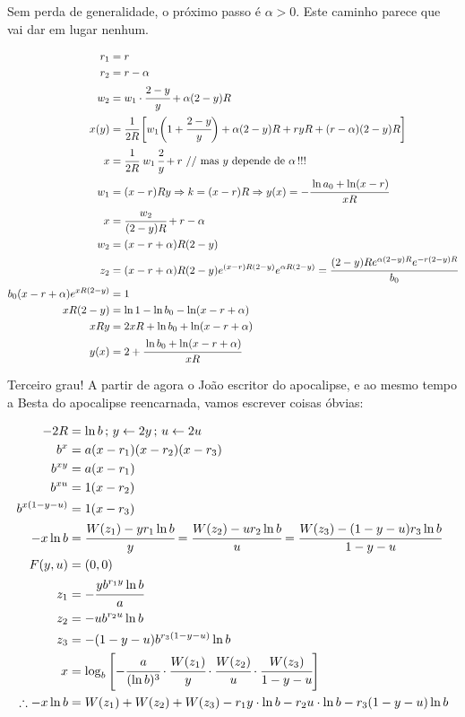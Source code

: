 \documentclass[11pt,a4paper]{article}
\begin{document}
Sem perda de generalidade, o pr\'oximo passo \'e $\alpha > 0$. Este caminho parece que vai dar em lugar nenhum.

\begin{align}
r_1 &= r \\
r_2 &= r - \alpha \\
w_2 &= w_1\cdot \cfrac{2 - y}{y} + \alpha (2 - y) R \\
x(y) &= \cfrac{1}{2R}\, \bigg[w_1\bigg(1 + \cfrac{2 - y}{y}\bigg) + \alpha (2 - y) R + ryR + (r - \alpha)(2 - y)R\bigg] \\
x &=  \cfrac{1}{2R}\,\,w_1\,\cfrac{2}{y} + r \text{ // mas } y \text{ depende de }\alpha\,!!! \\
w_1 &= (x - r)Ry \Rightarrow k = (x - r)R \Rightarrow y(x) = - \cfrac{\ln a_0 + \ln (x - r)}{xR} \\
x &=  \cfrac{w_2}{(2-y)R} + r - \alpha \\
w_2 &= (x - r + \alpha)R(2-y) \\
z_2 &= (x - r + \alpha)R(2-y)e^{(x - r)R(2-y)}e^{\alpha R(2-y)} = \cfrac{(2 - y)Re^{\alpha(2 - y)R}e^{-r(2 - y)R}}{b_0} \\
b_0 (x - r + \alpha)e^{xR(2-y)} &= 1 \\
xR(2-y) &= \ln 1 - \ln b_0 - \ln (x - r + \alpha) \\
xRy &= 2xR + \ln b_0 + \ln (x - r + \alpha) \\
y(x) &= 2 + \cfrac{\ln b_0 + \ln (x - r + \alpha)}{xR}
\end{align}

Terceiro grau! A partir de agora o Jo\~ao escritor do apocalipse, e ao mesmo tempo a Besta do apocalipse reencarnada, vamos escrever coisas \'obvias:

\begin{align}
  -2R &= \ln b\,;\,y \leftarrow 2y\,;\,u \leftarrow 2u \\
  b^x &= a (x - r_1) (x - r_2) (x - r_3) \\
  b^{xy} &= a (x - r_1) \\
  b^{xu} &= 1 (x - r_2) \\
  b^{x(1 - y - u)} &= 1 (x - r_3) \\
  -x \ln b &= \cfrac{W(z_1) - y r_1 \ln b}{y} = \cfrac{W(z_2) - u r_2 \ln b}{u} = \cfrac{W(z_3) - (1 - y - u) r_3 \ln b}{1 - y - u} \\
  F(y,u) &= (0,0) \\
  z_1 &= - \cfrac{yb^{r_1y} \ln b}{a} \\
  z_2 &= -u b^{r_2u} \ln b \\
  z_3 &= -(1-y-u) b^{r_3(1-y-u)} \ln b \\
  x &= \log_b \left[ -\cfrac{a}{(\ln b)^3} \cdot \cfrac{W(z_1)}{y} \cdot \cfrac{W(z_2)}{u} \cdot \cfrac{W(z_3)}{1 - y - u} \right] \\
  \therefore -x \ln b &= W(z_1) + W(z_2) + W(z_3) - r_1 y \cdot \ln b - r_2 u \cdot \ln b - r_3 (1 - y - u) \ln b
\end{align}
\end{document}
